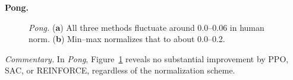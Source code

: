 \noindent \textbf{Pong.}
\begin{figure} 
	\centering
	\quad
	\caption{\emph{Pong.}
		(\textbf{a}) All three methods fluctuate around 0.0--0.06 in human norm.
		(\textbf{b}) Min--max normalizes that to about 0.0--0.2.}
	\label{fig:pong_combined}
\end{figure}

\noindent
\emph{Commentary.} In \emph{Pong}, Figure~\ref{fig:pong_combined} reveals no substantial improvement by PPO, SAC, or REINFORCE, regardless of the normalization scheme.


